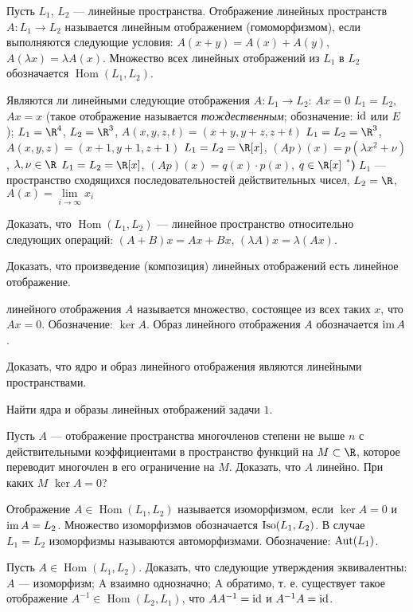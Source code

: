\documentclass[12pt]{article}
\newcommand{\pstar}[1][]{\refstepcounter{pnum}{\immediate\write\tempfile{\arabic{znum}.\arabic{pnum}.\pstyle.\if\relax\detokenize{#1}\relax\zprev\else#1\fi}} {\bf\thepnum}$^{\mbox{#1}*}${\bf{)}$\;$}}
\DeclareMathOperator{\Hom}{Hom}
\newcommand{\image}{{\rm{im}\,}}
\newcommand{\Iso}{{\rm Iso}}
\newcommand{\Aut}{{\rm Aut}}
\newcommand{\id}{{\rm{id}}}
\begin{document}

 Пусть $L_1$, $L_2$ --- линейные пространства. Отображение линейных пространств $A\colon L_1 \rightarrow L_2$ называется линейным отображением (гомоморфизмом), если выполняются следующие
условия: $A(x + y) = A(x) + A(y)$, $A(\lambda x) = \lambda A(x)$.
Множество всех линейных отображений из $L_1$ в $L_2$ обозначается $\Hom(L_1 , L_2)$.

\z Являются ли линейными следующие отображения
$A\colon L_1 \rightarrow L_2$:
	\p $Ax = 0$
	\p $L_1 = L_2$, $Ax = x$ (такое отображение называется {\it тождественным}; обозначение: $\id$ или $E$);
	\p $L_1 = \R^4$, $L_2 = \R^3$, $A(x, y, z, t) = (x + y, y + z, z + t)$
	\p $L_1 = L_2 = \R^3$, $A(x, y, z) = (x + 1, y + 1, z + 1)$
	\p $L_1 = L_2 = \R[x]$, $(Ap)(x) = p(\lambda x^2 + \nu)$, $\lambda,\nu\in\R$
	\p $L_1 = L_2 = \R[x]$, $(Ap)(x) = q(x)\cdot p(x)$, $q\in\R[x]$
	\pstar $L_1$ --- пространство сходящихся последовательностей действительных чисел, $L_2=\R$, $A(x) = \lim\limits_{i\rightarrow\infty}x_i$

\z Доказать, что $\Hom(L_1, L_2)$ --- линейное пространство относительно следующих операций: $(A + B)x = Ax + Bx$, $(\lambda A)x = \lambda(Ax)$.

\z Доказать, что произведение (композиция) линейных
отображений есть линейное отображение.

 линейного отображения $A$ называется
множество, состоящее из всех таких $x$, что $Ax = 0$. Обозначение: $\ker A$.
Образ линейного отображения $A$ обозначается $\image A$.

\z Доказать, что ядро и образ линейного отображения являются линейными пространствами.

\z Найти ядра и образы линейных отображений задачи $1$.

\z Пусть $A$ --- отображение пространства многочленов степени не выше $n$
с действительными коэффициентами в пространство
функций на $M \subset \R$, которое переводит многочлен в его ограничение
на $M$.
	\p Доказать, что $A$ линейно.
	\p При каких $M$ $\ker A = 0$?




 Отображение $A \in \Hom(L_1, L_2)$ называется изоморфизмом,
если $\ker A = 0$ и $\image A = L_2$.
Множество изоморфизмов обозначается $\Iso(L_1, L_2)$.
В случае $L_1 = L_2$ изоморфизмы называются автоморфизмами.
Обозначение: $\Aut(L_1)$.

\z Пусть $A \in \Hom(L_1 , L_2)$. Доказать, что следующие утверждения эквивалентны:
	\p $A$ --- изоморфизм;
	\p A взаимно однозначно;
	\p A обратимо, т. е. существует такое отображение $A^{-1} \in \Hom(L_2, L_1)$, что $AA^{-1} = \id$ и $A^{-1} A = \id$.
\end{document}

